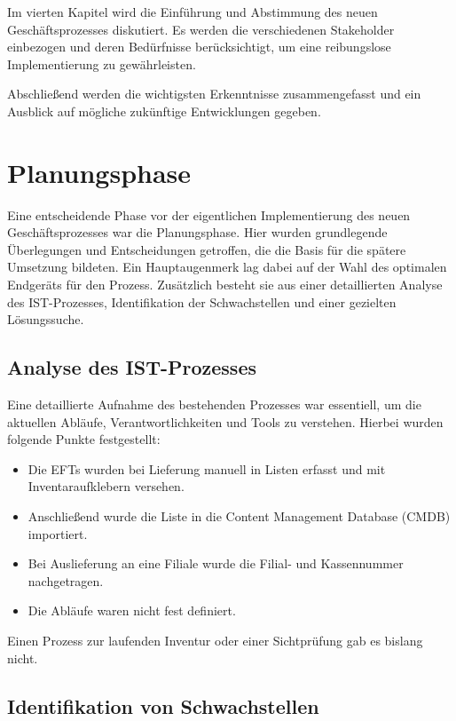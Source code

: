 \documentclass[12pt, a4paper]{article}
\begin{document}
Im vierten Kapitel wird die Einführung und Abstimmung des neuen Geschäftsprozesses diskutiert. Es werden die verschiedenen Stakeholder einbezogen und deren Bedürfnisse 
berücksichtigt, um eine reibungslose Implementierung zu gewährleisten.

Abschließend werden die wichtigsten Erkenntnisse zusammengefasst und ein Ausblick auf mögliche zukünftige Entwicklungen gegeben.

\section{Planungsphase}

Eine entscheidende Phase vor der eigentlichen Implementierung des neuen Geschäftsprozesses war die Planungsphase. Hier wurden grundlegende Überlegungen und Entscheidungen 
getroffen, die die Basis für die spätere Umsetzung bildeten. Ein Hauptaugenmerk lag dabei auf der Wahl des optimalen Endgeräts für den Prozess.
Zusätzlich besteht sie aus einer detaillierten Analyse des IST-Prozesses, Identifikation der Schwachstellen und einer gezielten Lösungssuche.

\subsection{Analyse des IST-Prozesses}

Eine detaillierte Aufnahme des bestehenden Prozesses war essentiell, um die aktuellen Abläufe, Verantwortlichkeiten und Tools zu verstehen. Hierbei wurden folgende Punkte 
festgestellt:
\begin{itemize}
\item Die EFTs wurden bei Lieferung manuell in Listen erfasst und mit Inventaraufklebern versehen.
\item Anschließend wurde die Liste in die Content Management Database (CMDB) importiert.
\item Bei Auslieferung an eine Filiale wurde die Filial- und Kassennummer nachgetragen.
\item Die Abläufe waren nicht fest definiert.
\end{itemize}
Einen Prozess zur laufenden Inventur oder einer Sichtprüfung gab es bislang nicht.

\subsection{Identifikation von Schwachstellen}
\end{document}
